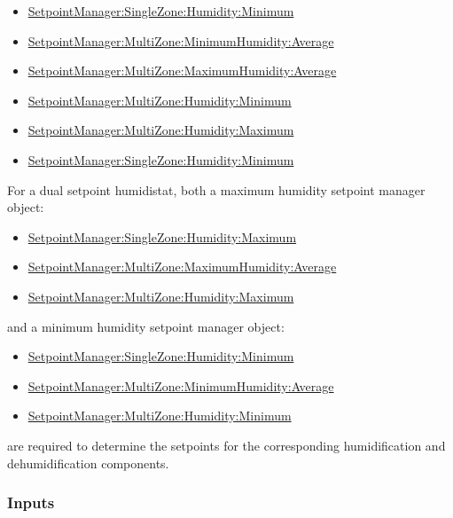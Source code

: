 \begin{itemize}
\item
  \hyperref[setpointmanagersinglezonehumidityminimum]{SetpointManager:SingleZone:Humidity:Minimum}
\item
  \hyperref[setpointmanagermultizoneminimumhumidityaverage]{SetpointManager:MultiZone:MinimumHumidity:Average}
\item
  \hyperref[setpointmanagermultizonemaximumhumidityaverage]{SetpointManager:MultiZone:MaximumHumidity:Average}
\item
  \hyperref[setpointmanagermultizonehumidityminimum]{SetpointManager:MultiZone:Humidity:Minimum}
\item
  \hyperref[setpointmanagermultizonehumiditymaximum]{SetpointManager:MultiZone:Humidity:Maximum}
\item
  \hyperref[setpointmanagersinglezonehumidityminimum]{SetpointManager:SingleZone:Humidity:Minimum}
\end{itemize}

For a dual setpoint humidistat, both a maximum humidity setpoint manager object:

\begin{itemize}
\item
  \hyperref[setpointmanagersinglezonehumiditymaximum]{SetpointManager:SingleZone:Humidity:Maximum}
\item
  \hyperref[setpointmanagermultizonemaximumhumidityaverage]{SetpointManager:MultiZone:MaximumHumidity:Average}
\item
  \hyperref[setpointmanagermultizonehumiditymaximum]{SetpointManager:MultiZone:Humidity:Maximum}
\end{itemize}

and a minimum humidity setpoint manager object:

\begin{itemize}
\item
  \hyperref[setpointmanagersinglezonehumidityminimum]{SetpointManager:SingleZone:Humidity:Minimum}
\item
  \hyperref[setpointmanagermultizoneminimumhumidityaverage]{SetpointManager:MultiZone:MinimumHumidity:Average}
\item
  \hyperref[setpointmanagermultizonehumidityminimum]{SetpointManager:MultiZone:Humidity:Minimum}
\end{itemize}

are required to determine the setpoints for the corresponding humidification and dehumidification components.

\subsubsection{Inputs}\label{inputs-8-028}

